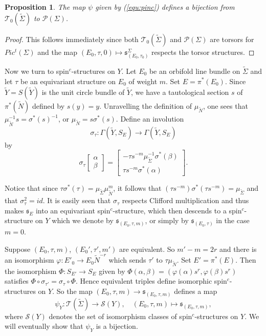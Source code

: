 \documentclass{amsart}
\newtheorem{proposition}[theorem]{Proposition}
\theoremstyle{definition}
\theoremstyle{remark}
\numberwithin{equation}{section}
\begin{document}
\begin{proposition}
The map $\psi$ given by (\ref{equ:pinc}) defines a bijection from $\mathcal{T}_0(\widetilde{\Sigma})$ to $\mathcal{P}(\Sigma)$.
\end{proposition}
\begin{proof}
This follows immediately since both $\mathcal{T}_0(\widetilde{\Sigma})$ and $\mathcal{P}(\Sigma)$ are torsors for $Pic^t(\Sigma)$ and the map $(E_0 , \tau , 0) \mapsto \mathfrak{s}^{\Sigma}_{(E_0 , \tau_0)}$ respects the torsor structures.
\end{proof}

Now we turn to spin$^c$-structures on $Y$. Let $E_0$ be an orbifold line bundle on $\widetilde{\Sigma}$ and let $\tau$ be an equivariant structure on $E_0$ of weight $m$. Set $E = \pi^*(E_0)$. Since $\widetilde{Y} = S(\widetilde{Y})$ is the unit circle bundle of $\widetilde{Y}$, we have a tautological section $s$ of $\pi^*(\widetilde{N})$ defined by $s(y) = y$. Unravelling the definition of $\mu_{\widetilde{N}}$, one sees that $\mu_{\widetilde{N}}^{-1} s = \sigma^*(s)^{-1}$, or $\mu_{\widetilde{N}} = s \sigma^*(s)$. Define an involution
\[
\sigma_\tau : \Gamma( \widetilde{Y} , S_E) \to \Gamma( \widetilde{Y} , S_E)
\]
by
\begin{equation}\label{equ:sigmatau}
\sigma_{\tau} \left[ \begin{matrix} \alpha \\ \beta \end{matrix} \right] = \left[ \begin{matrix} -\tau s^{-m} \mu_{\widetilde{\Sigma}}^{-1} \sigma^*(\beta) \\ \tau s^{-m} \sigma^*(\alpha) \end{matrix} \right].
\end{equation}

Notice that since $\tau \sigma^*(\tau) = \mu_{\widetilde{\Sigma}} \mu_{\widetilde{N}}^m$, it follows that $(\tau s^{-m}) \sigma^*(\tau s^{-m}) = \mu_{\widetilde{\Sigma}}$ and that $\sigma_\tau^2 = id$. It is easily seen that $\sigma_\tau$ respects Clifford multiplication and thus makes $\mathfrak{s}_E$ into an equivariant spin$^c$-structure, which then descends to a spin$^c$-structure on $Y$ which we denote by $\mathfrak{s}_{(E_0 , \tau , m)}$, or simply by $\mathfrak{s}_{(E_0 , \tau)}$ in the case $m=0$.

Suppose $(E_0 , \tau , m)$, $(E_0' , \tau' , m')$ are equivalent. So $m' - m = 2r$ and there is an isomorphism $\varphi : E'_0 \to E_0 \widetilde{N}^{-r}$ which sends $\tau'$ to $\tau \mu_{\widetilde{N}}$. Set $E' = \pi^*(E)$. Then the isomorphism $\Phi : S_{E'} \to S_{E}$ given by $\Phi(\alpha , \beta) = ( \varphi(\alpha) s^r , \varphi(\beta) s^r)$ satisfies $\Phi \circ \sigma_{\tau'} = \sigma_{\tau} \circ \Phi$. Hence equivalent triples define isomorphic spin$^c$-structures on $Y$. So the map $(E_0 , \tau , m) \to \mathfrak{s}_{(E_0 , \tau , m)}$ defines a map
\[
\psi_Y : \mathcal{T}(\widetilde{\Sigma}) \to \mathcal{S}(Y), \quad (E_0 , \tau , m) \mapsto \mathfrak{s}_{(E_0 , \tau , m)},
\]
where $\mathcal{S}(Y)$ denotes the set of isomorphism classes of spin$^c$-structures on $Y$. We will eventually show that $\psi_Y$ is a bijection.
\end{document}
